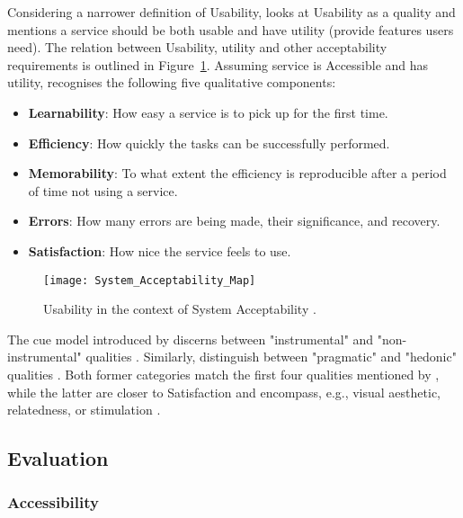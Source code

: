 Considering a narrower definition of Usability, \textcite{Nielsen_1993} looks at Usability as a quality and mentions a service should be both usable and have utility (provide features users need).
The relation between Usability, utility and other acceptability requirements is outlined in Figure~\ref{fig:system-acceptability}.
Assuming service is Accessible and has utility, \textcite{Nielsen_1993} recognises the following five qualitative components:

\begin{itemize}
    \item \textbf{Learnability}: How easy a service is to pick up for the first time.
    \item \textbf{Efficiency}: How quickly the tasks can be successfully performed.
    \item \textbf{Memorability}: To what extent the efficiency is reproducible after a period of time not using a service.
    \item \textbf{Errors}: How many errors are being made, their significance, and recovery.
    \item \textbf{Satisfaction}: How nice the service feels to use.
\end{itemize}

\begin{figure}[ht]
    \centering
    \texttt{[image: System\_Acceptability\_Map]}
    \caption{Usability in the context of System Acceptability \parencite{Wilson_2009}.}
    \label{fig:system-acceptability}
\end{figure}

The \gls{cue} model introduced by \textcite{Thüring_Mahlke_2007} discerns between "instrumental" and "non-instrumental" qualities \parencite[p. 1209]{Juergen_et_all_2020}.
Similarly, \textcite{Hassenzahl_2008} distinguish between "pragmatic" and "hedonic" qualities \parencite[p. 1209]{Juergen_et_all_2020}.
Both former categories match the first four qualities mentioned by \textcite{Nielsen_1993}, while the latter are closer to Satisfaction and encompass, e.g., visual aesthetic, relatedness, or stimulation \parencite{Thüring_Mahlke_2007, Hassenzahl_2008}.

\subsection{Evaluation}
\label{Literature-HSIE-Evaluation}

\subsubsection{Accessibility}

